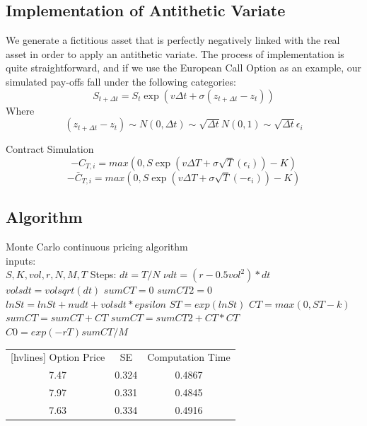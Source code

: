 \subsection{Implementation of Antithetic Variate}
\noindent We generate a fictitious asset that is perfectly negatively linked with the real asset in order to apply an antithetic variate. The process of implementation is quite straightforward, and if we use the European Call Option as an example, our simulated pay-offs fall under the following categories: 
$$S_{t+\Delta t}=S_{t}\exp(v\Delta t+\sigma(z_{t+\Delta t}-z_{t}))$$
Where
$$(z_{t+\Delta t}-z_{t}) \sim N(0,\Delta t)\sim \sqrt{\Delta t}N(0,1) \sim \sqrt{\Delta t}\epsilon_{i}$$

\noindent Contract Simulation
$$-C_{T,i}=max(0,S \exp(v\Delta T+\sigma\sqrt{T}(\epsilon_{i}))-K)$$
$$-\bar{C}_{T,i}=max(0,S \exp(v\Delta T+\sigma\sqrt{T}(-\epsilon_{i}))-K)$$
\subsection{Algorithm} 
\noindent Monte Carlo continuous pricing algorithm\\
inputs:  \\
$S, K, vol, r, N, M, T$ \newline
Steps:
$dt=T/N$ \newline
$\nu dt=(r-0.5vol^2)*dt$  \newline
$volsdt=volsqrt(dt)$  \newline
$sumCT=0$  \newline
$sumCT2=0$  \newline
\indent $lnSt=lnSt+nudt+volsdt*epsilon$  \newline
\indent $ST=exp(lnSt)$  \newline
\indent $CT=max(0,ST-k)$  \newline
\indent $sumCT=sumCT+CT$  \newline
\indent $sumCT=sumCT2+CT*CT$  \newline
$C0=exp(-rT)sumCT/M$  \newline
{}

\begin{center}
\begin{NiceTabular}{|c|c|c|}[hvlines]
	 Option Price & SE & Computation Time\\ 
	7.47 & 0.324 & 0.4867\\ 
	7.97 & 0.331 & 0.4845\\
	7.63 & 0.334 & 0.4916\\
\end{NiceTabular}
\end{center}


